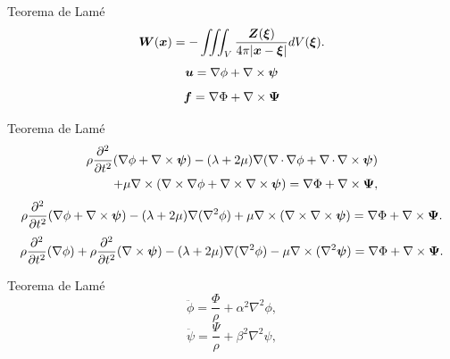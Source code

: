 \documentclass{beamer}
\begin{document}
\begin{frame}{Teorema de Lamé}
	\begin{equation}
	\boldsymbol{W}(\boldsymbol{x}) = - \iiint_V \frac{\boldsymbol{Z}(\boldsymbol{\xi})}{4\pi|\boldsymbol{x}-\boldsymbol{\xi}|}dV(\boldsymbol{\xi}). \nonumber
	\end{equation}
	\begin{equation}
	\boldsymbol{u} = \nabla{\phi} + \nabla\times\boldsymbol{\psi} \nonumber
	\label{eq_u}
	\end{equation}
	\begin{equation}
	\boldsymbol{f} = \nabla{\Phi} + \nabla\times\boldsymbol{\Psi} \nonumber
	\label{eq_f}
	\end{equation}
	
\end{frame}

\begin{frame}{Teorema de Lamé}
	\begin{eqnarray}
	\rho\frac{\partial^2}{\partial t^2}(\nabla\phi + \nabla\times\boldsymbol{\psi}) - 
	(\lambda + 2\mu)\nabla(\nabla\,\cdotp\nabla\phi + \nabla\,\cdotp\nabla\times\boldsymbol{\psi}) \nonumber \\
	+ \mu\nabla\times(\nabla\times\nabla\phi + \nabla\times\nabla\times\boldsymbol{\psi}) 
	= \nabla\Phi + \nabla\times\boldsymbol{\Psi}, \nonumber
	\end{eqnarray}
	\begin{equation}
	\rho\frac{\partial^2}{\partial t^2}(\nabla\phi + \nabla\times\boldsymbol{\psi}) - 
	(\lambda + 2\mu)\nabla(\nabla^2\phi)
	+ \mu\nabla\times(\nabla\times\nabla\times\boldsymbol{\psi}) 
	= \nabla\Phi + \nabla\times\boldsymbol{\Psi}. \nonumber
	\end{equation}
	\begin{equation}
	\rho\frac{\partial^2}{\partial t^2}(\nabla\phi) + \rho\frac{\partial^2}{\partial t^2}(\nabla\times\boldsymbol{\psi}) 
	- (\lambda + 2\mu)\nabla(\nabla^2\phi) - \mu\nabla\times(\nabla^2\boldsymbol{\psi})  
	= \nabla\Phi + \nabla\times\boldsymbol{\Psi}. \nonumber
	\label{eq:eq_tmp} 
	\end{equation}
	
	
\end{frame}

\begin{frame}{Teorema de Lamé}
	\begin{equation}
	\ddot{\phi} = \frac{\Phi}{\rho} + \alpha^2\nabla^2\phi, \nonumber
	\end{equation}
	\begin{equation}
	\ddot{\psi} = \frac{\Psi}{\rho} + \beta^2\nabla^2\psi, \nonumber
	\end{equation}
\end{frame}
\end{document}
